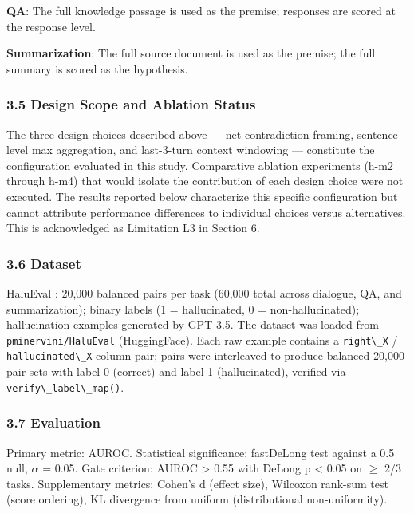 \textbf{QA}: The full knowledge passage is used as the premise; responses are scored at the response level.

\textbf{Summarization}: The full source document is used as the premise; the full summary is scored as the hypothesis.

\subsubsection{3.5 Design Scope and Ablation Status}

The three design choices described above --- net-contradiction framing, sentence-level max aggregation, and last-3-turn context windowing --- constitute the configuration evaluated in this study. Comparative ablation experiments (h-m2 through h-m4) that would isolate the contribution of each design choice were not executed. The results reported below characterize this specific configuration but cannot attribute performance differences to individual choices versus alternatives. This is acknowledged as Limitation L3 in Section 6.

\subsubsection{3.6 Dataset}

HaluEval \citep{Li2023HaluEval}: 20,000 balanced pairs per task (60,000 total across dialogue, QA, and summarization); binary labels (1 = hallucinated, 0 = non-hallucinated); hallucination examples generated by GPT-3.5. The dataset was loaded from \texttt{pminervini/HaluEval} (HuggingFace). Each raw example contains a \texttt{right\textbackslash \_X} / \texttt{hallucinated\textbackslash \_X} column pair; pairs were interleaved to produce balanced 20,000-pair sets with label 0 (correct) and label 1 (hallucinated), verified via \texttt{verify\textbackslash \_label\textbackslash \_map()}.

\subsubsection{3.7 Evaluation}

Primary metric: AUROC. Statistical significance: fastDeLong test \citep{DeLong1988Comparing} against a 0.5 null, $\alpha$ = 0.05. Gate criterion: AUROC > 0.55 with DeLong p < 0.05 on $\geq$ 2/3 tasks. Supplementary metrics: Cohen's d (effect size), Wilcoxon rank-sum test (score ordering), KL divergence from uniform (distributional non-uniformity).
